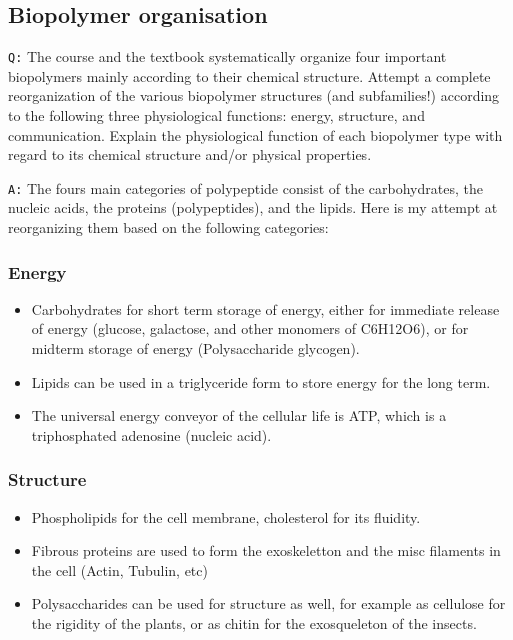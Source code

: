 \documentclass[11pt, a4paper,titlepage]{article}
\begin{document}
\subsection{Biopolymer organisation}
\label{sec-2-1}

\texttt{Q:} The course and the textbook systematically organize four important
biopolymers mainly according to their chemical structure. Attempt a
complete reorganization of the various biopolymer structures (and
subfamilies!) according to the following three physiological
functions: energy, structure, and communication. Explain the
physiological function of each biopolymer type with regard to its
chemical structure and/or physical properties.

\texttt{A:} The fours main categories of polypeptide consist of the
carbohydrates, the nucleic acids, the proteins (polypeptides), and the
lipids. Here is my attempt at reorganizing them based on the following
categories:
\subsubsection{Energy}
\label{sec-2-1-1}

\begin{itemize}
\item Carbohydrates for short term storage of energy, either for
  immediate release of energy (glucose, galactose, and other monomers
  of C6H12O6), or for midterm storage of energy (Polysaccharide
  glycogen).
\item Lipids can be used in a triglyceride form to store energy for the
  long term.
\item The universal energy conveyor of the cellular life is ATP, which is
  a triphosphated adenosine (nucleic acid).
\end{itemize}
\subsubsection{Structure}
\label{sec-2-1-2}

\begin{itemize}
\item Phospholipids for the cell membrane, cholesterol for its
  fluidity.
\item Fibrous proteins are used to form the exoskeletton and the
  misc filaments in the cell (Actin, Tubulin, etc)
\item Polysaccharides can be used for structure as well, for example as
  cellulose for the rigidity of the plants, or as chitin for the
  exosqueleton of the insects.
\end{itemize}
\end{document}
